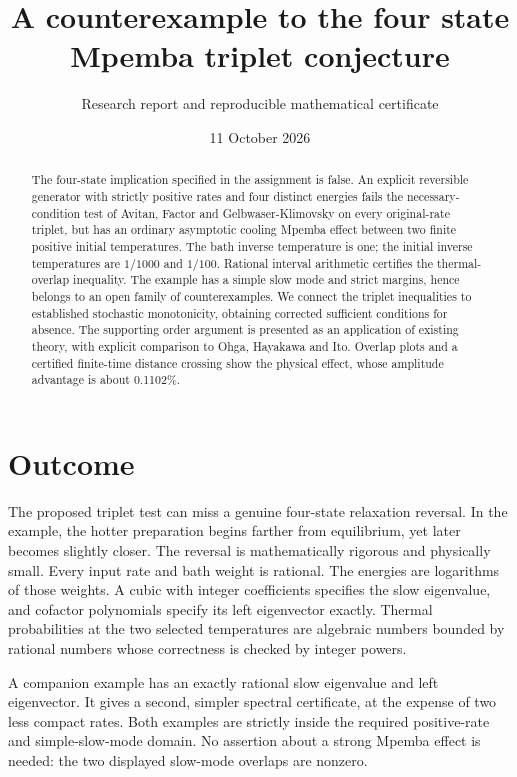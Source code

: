 \documentclass[11pt]{article}
\title{A counterexample to the four state Mpemba triplet conjecture}
\author{Research report and reproducible mathematical certificate}
\date{11 October 2026}
\begin{document}
\maketitle
\begin{abstract}
The four-state implication specified in the assignment is false. An explicit reversible generator with strictly positive rates and four distinct energies fails the necessary-condition test of Avitan, Factor and Gelbwaser-Klimovsky on every original-rate triplet, but has an ordinary asymptotic cooling Mpemba effect between two finite positive initial temperatures. The bath inverse temperature is one; the initial inverse temperatures are $1/1000$ and $1/100$. Rational interval arithmetic certifies the thermal-overlap inequality. The example has a simple slow mode and strict margins, hence belongs to an open family of counterexamples. We connect the triplet inequalities to established stochastic monotonicity, obtaining corrected sufficient conditions for absence. The supporting order argument is presented as an application of existing theory, with explicit comparison to Ohga, Hayakawa and Ito. Overlap plots and a certified finite-time distance crossing show the physical effect, whose amplitude advantage is about 0.1102\%.
\end{abstract}

\section{Outcome}
The proposed triplet test can miss a genuine four-state relaxation reversal. In the example, the hotter preparation begins farther from equilibrium, yet later becomes slightly closer. The reversal is mathematically rigorous and physically small. Every input rate and bath weight is rational. The energies are logarithms of those weights. A cubic with integer coefficients specifies the slow eigenvalue, and cofactor polynomials specify its left eigenvector exactly. Thermal probabilities at the two selected temperatures are algebraic numbers bounded by rational numbers whose correctness is checked by integer powers.

A companion example has an exactly rational slow eigenvalue and left eigenvector. It gives a second, simpler spectral certificate, at the expense of two less compact rates. Both examples are strictly inside the required positive-rate and simple-slow-mode domain. No assertion about a strong Mpemba effect is needed: the two displayed slow-mode overlaps are nonzero.
\end{document}
